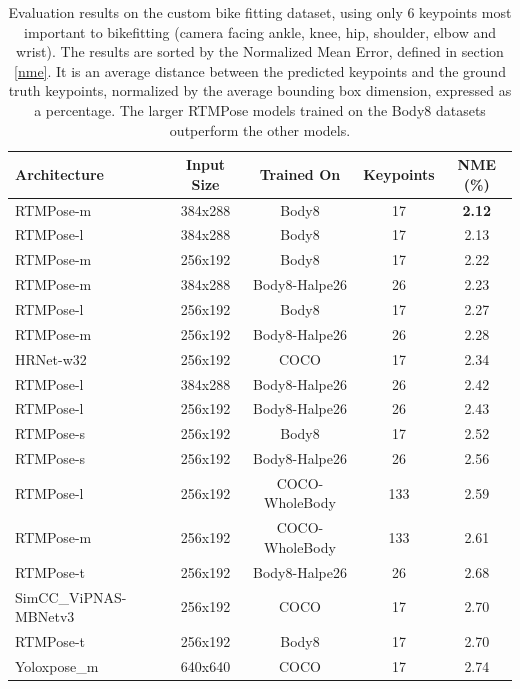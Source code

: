 \begin{table}[htb]
    \begin{tabular}{l cccc}
        \toprule
        Architecture          & Input Size & Trained On     & Keypoints & NME (\%)      \\
        \midrule
        RTMPose-m             & 384x288    & Body8          & 17        & \textbf{2.12} \\
        RTMPose-l             & 384x288    & Body8          & 17        & 2.13          \\
        RTMPose-m             & 256x192    & Body8          & 17        & 2.22          \\
        RTMPose-m             & 384x288    & Body8-Halpe26  & 26        & 2.23          \\
        RTMPose-l             & 256x192    & Body8          & 17        & 2.27          \\
        RTMPose-m             & 256x192    & Body8-Halpe26  & 26        & 2.28          \\
        HRNet-w32             & 256x192    & COCO           & 17        & 2.34          \\
        RTMPose-l             & 384x288    & Body8-Halpe26  & 26        & 2.42          \\
        RTMPose-l             & 256x192    & Body8-Halpe26  & 26        & 2.43          \\
        RTMPose-s             & 256x192    & Body8          & 17        & 2.52          \\
        RTMPose-s             & 256x192    & Body8-Halpe26  & 26        & 2.56          \\
        RTMPose-l             & 256x192    & COCO-WholeBody & 133       & 2.59          \\
        RTMPose-m             & 256x192    & COCO-WholeBody & 133       & 2.61          \\
        RTMPose-t             & 256x192    & Body8-Halpe26  & 26        & 2.68          \\
        SimCC\_ViPNAS-MBNetv3 & 256x192    & COCO           & 17        & 2.70          \\
        RTMPose-t             & 256x192    & Body8          & 17        & 2.70          \\
        Yoloxpose\_m          & 640x640    & COCO           & 17        & 2.74          \\
        \bottomrule
    \end{tabular}
    \caption{Evaluation results on the custom bike fitting dataset, using only 6 keypoints most important to bikefitting (camera facing ankle, knee, hip, shoulder, elbow and wrist). The results are sorted by the Normalized Mean Error, defined in section \ref{nme}. It is an average distance between the predicted keypoints and the ground truth keypoints, normalized by the average bounding box dimension, expressed as a percentage. The larger RTMPose models trained on the Body8 datasets outperform the other models.}
    \label{tab:evaluation_results_all}

\end{table}

